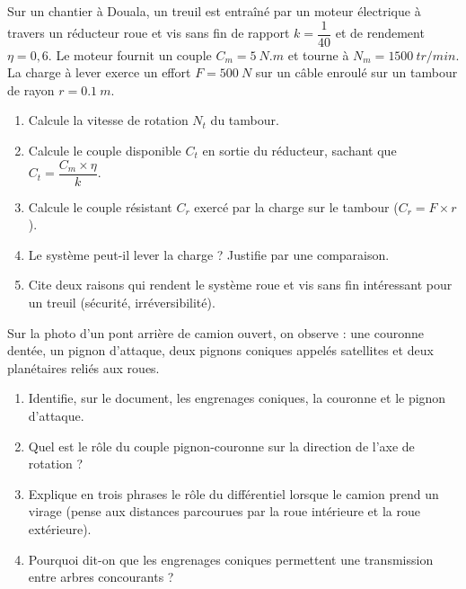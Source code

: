 \documentclass[11pt]{article}
\begin{document}
\begin{exercice}
Sur un chantier à Douala, un treuil est entraîné par un moteur électrique à travers un réducteur roue et vis sans fin de rapport $k = \dfrac{1}{40}$ et de rendement $\eta = 0,6$. Le moteur fournit un couple $C_m = \SI{5}{N.m}$ et tourne à $N_m = \SI{1500}{tr/min}$. La charge à lever exerce un effort $F = \SI{500}{N}$ sur un câble enroulé sur un tambour de rayon $r = \SI{0,1}{m}$.
\begin{enumerate}
\item Calcule la vitesse de rotation $N_t$ du tambour.
\item Calcule le couple disponible $C_t$ en sortie du réducteur, sachant que $C_t = \dfrac{C_m \times \eta}{k}$.
\item Calcule le couple résistant $C_r$ exercé par la charge sur le tambour ($C_r = F \times r$).
\item Le système peut-il lever la charge ? Justifie par une comparaison.
\item Cite deux raisons qui rendent le système roue et vis sans fin intéressant pour un treuil (sécurité, irréversibilité).
\end{enumerate}
\end{exercice}

\begin{exercice}
Sur la photo d'un pont arrière de camion ouvert, on observe : une couronne dentée, un pignon d'attaque, deux pignons coniques appelés satellites et deux planétaires reliés aux roues.
\begin{enumerate}
\item Identifie, sur le document, les engrenages coniques, la couronne et le pignon d'attaque.
\item Quel est le rôle du couple pignon-couronne sur la direction de l'axe de rotation ?
\item Explique en trois phrases le rôle du différentiel lorsque le camion prend un virage (pense aux distances parcourues par la roue intérieure et la roue extérieure).
\item Pourquoi dit-on que les engrenages coniques permettent une transmission entre arbres concourants ?
\end{enumerate}
\end{exercice}
\end{document}
